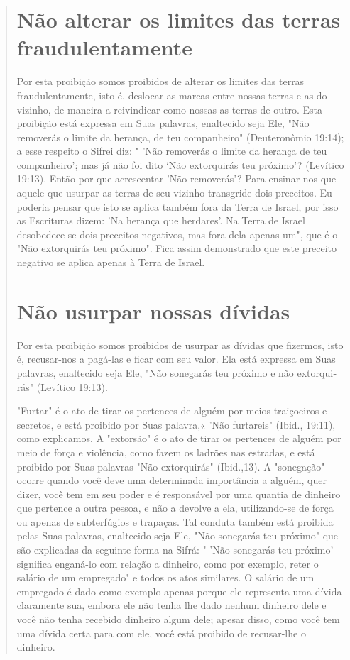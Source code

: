 \begin{quote}

\section{Não alterar os limites das terras fraudulentamente}

Por esta proibição somos proibidos de alterar os limites das terras
fraudulentamente, isto é, deslocar as marcas entre nossas terras e as do
vizinho, de maneira a reivindicar como nossas as terras de outro. Esta
proibição está expressa em Suas palavras, enaltecido seja Ele, "Não
removerás o limite da he­rança, de teu companheiro" (Deuteronômio
19:14); a esse respeito o Sifrei diz: " 'Não removerás o limite da
herança de teu companheiro'; mas já não foi dito `Não extorquirás teu
próximo'? (Levítico 19:13). Então por que acrescentar 'Não removerás'?
Para ensinar-nos que aquele que usurpar as terras de seu vizinho
transgride dois preceitos. Eu poderia pensar que isto se aplica também
fora da Terra de Israel, por isso as Escrituras dizem: 'Na herança que
herdares'. Na Ter­ra de Israel desobedece-se dois preceitos negativos,
mas fora dela apenas um", que é o "Não extorquirás teu próximo". Fica
assim demonstrado que este pre­ceito negativo se aplica apenas à Terra
de Israel.

\section{Não usurpar nossas dívidas}

Por esta proibição somos proibidos de usurpar as dívidas que fizer­mos,
isto é, recusar-nos a pagá-las e ficar com seu valor. Ela está expressa
em Suas palavras, enaltecido seja Ele, "Não sonegarás teu próximo e não
extorqui­rás" (Levítico 19:13).

"Furtar" é o ato de tirar os pertences de alguém por meios traiçoei­ros
e secretos, e está proibido por Suas palavra,« 'Não furtareis" (Ibid.,
19:11), como explicamos. A "extorsão" é o ato de tirar os pertences de
alguém por meio de força e violência, como fazem os ladrões nas
estradas, e está proibido por Suas palavras "Não extorquirás"
(Ibid.,13). A "sonegação" ocorre quando você deve uma determinada
importância a alguém, quer dizer, você tem em seu poder e é responsável
por uma quantia de dinheiro que pertence a outra pessoa, e não a devolve
a ela, utilizando-se de força ou apenas de subterfúgios e trapaças. Tal
conduta também está proibida pelas Suas palavras, enaltecido seja Ele,
"Não sonegarás teu próximo" que são explicadas da seguinte forma na
Sifrá: " 'Não sonegarás teu próximo' significa enganá-lo com relação a
di­nheiro, como por exemplo, reter o salário de um empregado" e todos os
atos similares. O salário de um empregado é dado como exemplo apenas
porque ele representa uma dívida claramente sua, embora ele não tenha
lhe dado ne­nhum dinheiro dele e você não tenha recebido dinheiro algum
dele; apesar dis­so, como você tem uma dívida certa para com ele, você
está proibido de recusar-lhe o dinheiro.


\end{quote}

